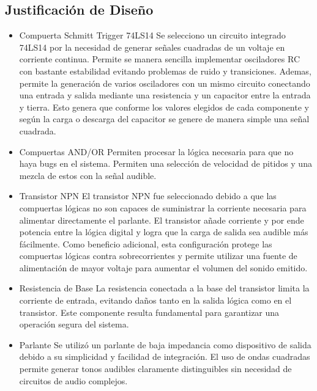 \documentclass[12pt, journal, onecolumn]{IEEEtran}
\begin{document}
\subsection{Justificación de Diseño}
\begin{itemize}
	\item{Compuerta Schmitt Trigger 74LS14}
		Se selecciono un circuito integrado 74LS14 por la necesidad de generar señales cuadradas de un voltaje en corriente continua. Permite se manera sencilla implementar osciladores RC con bastante estabilidad evitando problemas de ruido y transiciones. Ademas, permite la generación de varios osciladores con un mismo circuito conectando una entrada y salida mediante una resistencia y un capacitor entre la entrada y tierra. Esto genera que conforme los valores elegidos de cada componente y según la carga o descarga del capacitor se genere de manera simple una señal cuadrada.\\
		
	\item{Compuertas AND/OR}
		Permiten procesar la lógica necesaria para que no haya bugs en el sistema. Permiten una selección de velocidad de pitidos y una mezcla de estos con la señal audible.\\
		
	\item{Transistor NPN}
		El transistor NPN fue seleccionado debido a que las compuertas lógicas no son capaces de suministrar la corriente necesaria para alimentar directamente el parlante. El transistor añade corriente y por ende potencia entre la lógica digital y logra que la carga de salida sea audible más fácilmente.
		Como beneficio adicional, esta configuración protege las compuertas lógicas contra sobrecorrientes y permite utilizar una fuente de alimentación de mayor voltaje para aumentar el volumen del sonido emitido.\\
		
	\item{Resistencia de Base}
		La resistencia conectada a la base del transistor limita la corriente de entrada, evitando daños tanto en la salida lógica como en el transistor. Este componente resulta fundamental para garantizar una operación segura del sistema.\\
		
	\item{Parlante}
		Se utilizó un parlante de baja impedancia como dispositivo de salida debido a su simplicidad y facilidad de integración. El uso de ondas cuadradas permite generar tonos audibles claramente distinguibles sin necesidad de circuitos de audio complejos.
\end{itemize}
\end{document}

